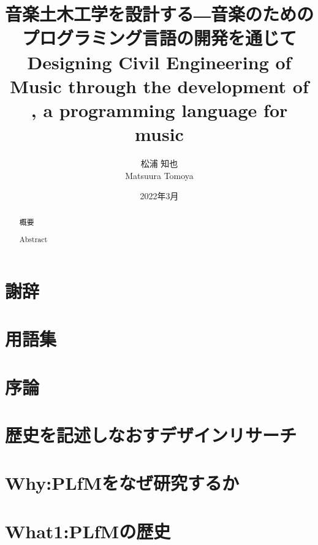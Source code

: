 \documentclass[dvipdfmx,a4paper,openany]{jsbook}
\title{音楽土木工学を設計する―音楽のためのプログラミング言語\mimium{}の開発を通じて\\
Designing Civil Engineering of Music through the development of \mimium{}, a programming language for music
}
\author{松浦 知也 \\
        Matsuura Tomoya}
\date{2022年3月}
\begin{document}
\frontmatter

\maketitle

\begin{abstract}
\chapter*{概要}
    
\chapter*{Abstract}
    
\end{abstract}

\chapter*{謝辞}


\setcounter{tocdepth}{3}
\tableofcontents

\chapter*{用語集}


\listoffigures
\renewcommand\lstlistlistingname{コード例目次}
\lstlistoflistings

\mainmatter

\chapter{序論}


\chapter{歴史を記述しなおすデザインリサーチ}


\chapter{Why:PLfMをなぜ研究するか}


\chapter{What1:PLfMの歴史}

\end{document}
